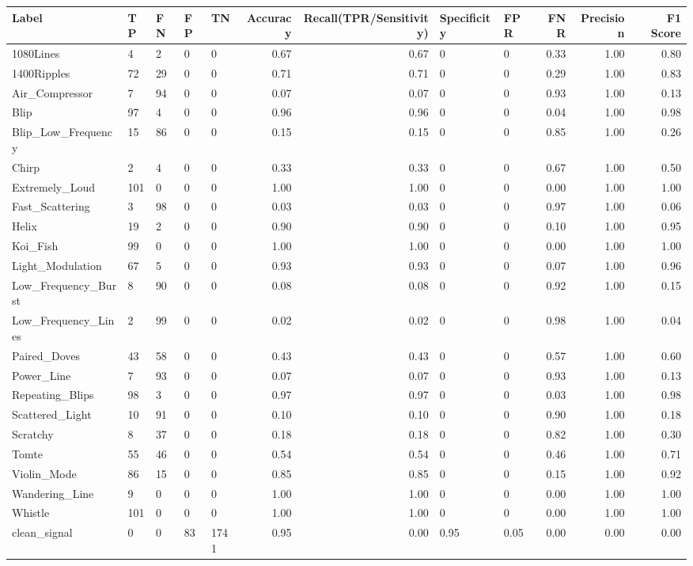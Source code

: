 \begin{tabular}{lllllrrllrrr}
\toprule
Label & TP & FN & FP & TN & Accuracy & Recall(TPR/Sensitivity) & Specificity & FPR & FNR & Precision & F1 Score \\
\midrule
1080Lines & 4 & 2 & 0 & 0 & 0.67 & 0.67 & 0 & 0 & 0.33 & 1.00 & 0.80 \\
1400Ripples & 72 & 29 & 0 & 0 & 0.71 & 0.71 & 0 & 0 & 0.29 & 1.00 & 0.83 \\
Air_Compressor & 7 & 94 & 0 & 0 & 0.07 & 0.07 & 0 & 0 & 0.93 & 1.00 & 0.13 \\
Blip & 97 & 4 & 0 & 0 & 0.96 & 0.96 & 0 & 0 & 0.04 & 1.00 & 0.98 \\
Blip_Low_Frequency & 15 & 86 & 0 & 0 & 0.15 & 0.15 & 0 & 0 & 0.85 & 1.00 & 0.26 \\
Chirp & 2 & 4 & 0 & 0 & 0.33 & 0.33 & 0 & 0 & 0.67 & 1.00 & 0.50 \\
Extremely_Loud & 101 & 0 & 0 & 0 & 1.00 & 1.00 & 0 & 0 & 0.00 & 1.00 & 1.00 \\
Fast_Scattering & 3 & 98 & 0 & 0 & 0.03 & 0.03 & 0 & 0 & 0.97 & 1.00 & 0.06 \\
Helix & 19 & 2 & 0 & 0 & 0.90 & 0.90 & 0 & 0 & 0.10 & 1.00 & 0.95 \\
Koi_Fish & 99 & 0 & 0 & 0 & 1.00 & 1.00 & 0 & 0 & 0.00 & 1.00 & 1.00 \\
Light_Modulation & 67 & 5 & 0 & 0 & 0.93 & 0.93 & 0 & 0 & 0.07 & 1.00 & 0.96 \\
Low_Frequency_Burst & 8 & 90 & 0 & 0 & 0.08 & 0.08 & 0 & 0 & 0.92 & 1.00 & 0.15 \\
Low_Frequency_Lines & 2 & 99 & 0 & 0 & 0.02 & 0.02 & 0 & 0 & 0.98 & 1.00 & 0.04 \\
Paired_Doves & 43 & 58 & 0 & 0 & 0.43 & 0.43 & 0 & 0 & 0.57 & 1.00 & 0.60 \\
Power_Line & 7 & 93 & 0 & 0 & 0.07 & 0.07 & 0 & 0 & 0.93 & 1.00 & 0.13 \\
Repeating_Blips & 98 & 3 & 0 & 0 & 0.97 & 0.97 & 0 & 0 & 0.03 & 1.00 & 0.98 \\
Scattered_Light & 10 & 91 & 0 & 0 & 0.10 & 0.10 & 0 & 0 & 0.90 & 1.00 & 0.18 \\
Scratchy & 8 & 37 & 0 & 0 & 0.18 & 0.18 & 0 & 0 & 0.82 & 1.00 & 0.30 \\
Tomte & 55 & 46 & 0 & 0 & 0.54 & 0.54 & 0 & 0 & 0.46 & 1.00 & 0.71 \\
Violin_Mode & 86 & 15 & 0 & 0 & 0.85 & 0.85 & 0 & 0 & 0.15 & 1.00 & 0.92 \\
Wandering_Line & 9 & 0 & 0 & 0 & 1.00 & 1.00 & 0 & 0 & 0.00 & 1.00 & 1.00 \\
Whistle & 101 & 0 & 0 & 0 & 1.00 & 1.00 & 0 & 0 & 0.00 & 1.00 & 1.00 \\
clean_signal & 0 & 0 & 83 & 1741 & 0.95 & 0.00 & 0.95 & 0.05 & 0.00 & 0.00 & 0.00 \\
\bottomrule
\end{tabular}
